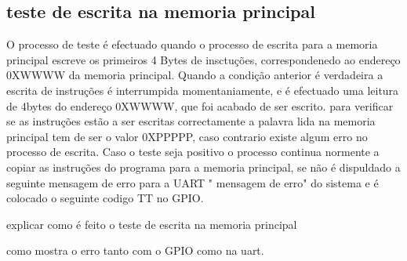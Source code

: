 \subsection{teste de escrita na memoria principal }

O processo de teste é efectuado quando o processo de escrita para a memoria principal escreve os primeiros 4 Bytes de insctuções, correspondenedo ao endereço 0XWWWW da memoria principal. Quando a condição anterior é verdadeira a escrita de instruções é interrumpida momentaniamente, e é efectuado uma leitura de 4bytes do endereço  0XWWWW, que foi acabado de ser escrito. para verificar se as instruções estão a ser escritas correctamente a palavra lida na memoria principal tem de ser o valor 0XPPPPP, caso contrario existe algum erro no processo de escrita. Caso o teste seja positivo o processo continua normente a copiar as instruções do programa para a memoria principal, se não é dispuldado a seguinte mensagem de erro para a UART " mensagem de erro" do sistema e é colocado o seguinte codigo TT no GPIO.

explicar como é feito o teste de escrita na memoria principal 

como mostra o erro tanto com o GPIO como na uart.